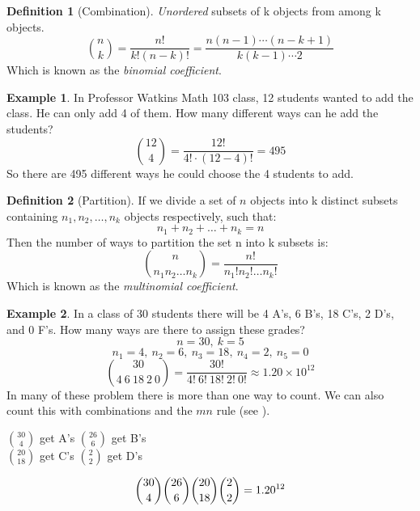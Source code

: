 \documentclass{article}
\theoremstyle{plain}
\theoremstyle{definition}
\newtheorem{defn}{Definition}[section]
\newtheorem{example}{Example}[section]
\theoremstyle{remark}
\begin{document}
\begin{defn}[Combination]
\textit{Unordered} subsets of k objects from among k objects.
$$
{n \choose k} = \frac{n!}{k!(n-k)!} = \frac{n (n-1)\cdots (n-k+1)}{k(k-1)\cdots 2}
$$
Which is known as the \textit{binomial coefficient}.
\end{defn}

\begin{example}
In Professor Watkins Math 103 class, 12 students wanted to add the class. He can only add 4 of them. How many different ways can he add the students?
$$
{12 \choose 4} = \frac{12!}{4!\cdot (12-4)!} = 495
$$
So there are 495 different ways he could choose the 4 students to add.
\end{example}

\begin{defn}[Partition]
  If we divide a set of $n$ objects into k distinct subsets containing $n_1,n_2,\ldots,n_k$ objects respectively, such that:
$$
n_1 + n_2 + \ldots + n_k = n
$$
Then the number of ways to partition the set n into k subsets is:
$$
{n \choose {n_1n_2\ldots n_k}} = \frac{n!}{n_1!n_2!\ldots n_k!}
$$
Which is known as the \textit{multinomial coefficient}.
\end{defn}
\begin{example}
In a class of 30 students there will be 4 A's, 6 B's, 18 C's, 2 D's, and 0 F's. How many ways are there to assign these grades?\\
$$n = 30,\ k = 5$$
$$n_1 = 4,\ n_2 = 6,\ n_3 = 18,\ n_4 = 2,\ n_5 = 0$$
$$
{30 \choose {4\ 6\ 18\ 2\ 0}} = \frac{30!}{4!\ 6!\ 18!\ 2!\ 0!} \approx 1.20 \times 10^{12}
$$
In many of these problem there is more than one way to count. We can also count this with combinations and the $mn$ rule (see ).
\begin{center}
${30 \choose 4}$ get A's
${26 \choose 6}$ get B's\\[5pt]
${20 \choose 18}$ get C's
${2 \choose 2}$ get D's

$$
{30 \choose 4}
{26 \choose 6}
{20 \choose 18}
{2 \choose 2} = 1.20 \time 10^{12}
$$
\end{center}
\end{example}
\end{document}

